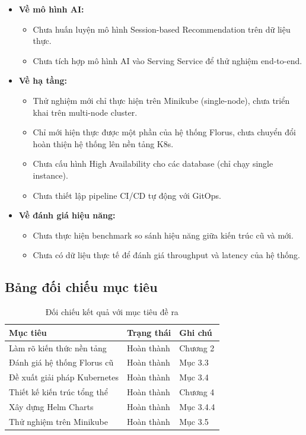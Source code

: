 \begin{itemize}
    \item \textbf{Về mô hình AI:}
    \begin{itemize}
        \item Chưa huấn luyện mô hình Session-based Recommendation trên dữ liệu thực.
        \item Chưa tích hợp mô hình AI vào Serving Service để thử nghiệm end-to-end.
    \end{itemize}

    \item \textbf{Về hạ tầng:}
    \begin{itemize}
        \item Thử nghiệm mới chỉ thực hiện trên Minikube (single-node), chưa triển khai trên multi-node cluster.
        \item Chỉ mới hiện thực được một phần của hệ thống Florus, chưa chuyển đổi hoàn thiện hệ thống lên nền tảng K8s.
        \item Chưa cấu hình High Availability cho các database (chỉ chạy single instance).
        \item Chưa thiết lập pipeline CI/CD tự động với GitOps.
    \end{itemize}

    \item \textbf{Về đánh giá hiệu năng:}
    \begin{itemize}
        \item Chưa thực hiện benchmark so sánh hiệu năng giữa kiến trúc cũ và mới.
        \item Chưa có dữ liệu thực tế để đánh giá throughput và latency của hệ thống.
    \end{itemize}
\end{itemize}

\subsection{Bảng đối chiếu mục tiêu}

\begin{table}[H]
\centering
\caption{Đối chiếu kết quả với mục tiêu đề ra}
\label{tab:objective-mapping}
\begin{tabular}{|p{6cm}|l|p{5cm}|}
\hline
\textbf{Mục tiêu} & \textbf{Trạng thái} & \textbf{Ghi chú} \\
\hline
Làm rõ kiến thức nền tảng & Hoàn thành & Chương 2 \\
\hline
Đánh giá hệ thống Florus cũ & Hoàn thành & Mục 3.3 \\
\hline
Đề xuất giải pháp Kubernetes & Hoàn thành & Mục 3.4 \\
\hline
Thiết kế kiến trúc tổng thể & Hoàn thành & Chương 4 \\
\hline
Xây dựng Helm Charts & Hoàn thành & Mục 3.4.4 \\
\hline
Thử nghiệm trên Minikube & Hoàn thành & Mục 3.5 \\
\hline
\end{tabular}
\end{table}
